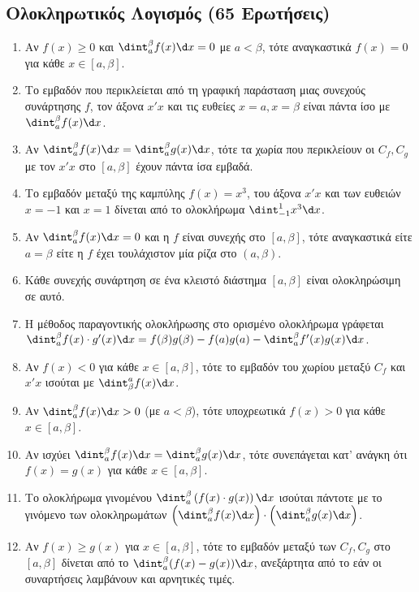 \subsection{Ολοκληρωτικός Λογισμός (65 Ερωτήσεις)}
\begin{enumerate}[label=\textbf{3.\arabic*.}]
    \item Αν $f(x) \ge 0$ και $\dint_{a}^{\beta} f(x)\d x = 0$ με $a < \beta$, τότε αναγκαστικά $f(x)=0$ για κάθε $x \in [a, \beta]$.
    \item Το εμβαδόν που περικλείεται από τη γραφική παράσταση μιας συνεχούς συνάρτησης $f$, τον άξονα $x'x$ και τις ευθείες $x=a, x=\beta$ είναι πάντα ίσο με $\dint_{a}^{\beta} f(x)\d x$.
    \item Αν $\dint_a^\beta f(x)\d x = \dint_a^\beta g(x)\d x$, τότε τα χωρία που περικλείουν οι $C_f, C_g$ με τον $x'x$ στο $[a, \beta]$ έχουν πάντα ίσα εμβαδά.
    \item Το εμβαδόν μεταξύ της καμπύλης $f(x)=x^3$, του άξονα $x'x$ και των ευθειών $x=-1$ και $x=1$ δίνεται από το ολοκλήρωμα $\dint_{-1}^1 x^3 \d x$.
    \item Αν $\dint_a^\beta f(x)\d x = 0$ και η $f$ είναι συνεχής στο $[a, \beta]$, τότε αναγκαστικά είτε $a = \beta$ είτε η $f$ έχει τουλάχιστον μία ρίζα στο $(a,\beta)$.
    \item Κάθε συνεχής συνάρτηση σε ένα κλειστό διάστημα $[a,\beta]$ είναι ολοκληρώσιμη σε αυτό.
    \item Η μέθοδος παραγοντικής ολοκλήρωσης στο ορισμένο ολοκλήρωμα γράφεται $\dint_{a}^{\beta} f(x) \cdot g'(x) \d x = f(\beta)g(\beta) - f(a)g(a) - \dint_{a}^{\beta} f'(x)g(x) \d x$.
    \item Αν $f(x) < 0$ για κάθε $x \in [a, \beta]$, τότε το εμβαδόν του χωρίου μεταξύ $C_f$ και $x'x$ ισούται με $\dint_{\beta}^{a} f(x)\d x$.
    \item Αν $\dint_{a}^{\beta} f(x)\d x > 0$ (με $a < \beta$), τότε υποχρεωτικά $f(x) > 0$ για κάθε $x \in [a, \beta]$.
    \item Αν ισχύει $\dint_a^\beta f(x) \d x = \dint_a^\beta g(x) \d x$, τότε συνεπάγεται κατ' ανάγκη ότι $f(x) = g(x)$ για κάθε $x \in [a,\beta]$.
    \item Το ολοκλήρωμα γινομένου $\dint_{a}^{\beta} \left( f(x) \cdot g(x) \right) \d x$ ισούται πάντοτε με το γινόμενο των ολοκληρωμάτων $\left( \dint_{a}^{\beta} f(x)\d x \right) \cdot \left( \dint_{a}^{\beta} g(x)\d x \right)$.
    \item Αν $f(x) \ge g(x)$ για $x \in [a, \beta]$, τότε το εμβαδόν μεταξύ των $C_f, C_g$ στο $[a, \beta]$ δίνεται από το $\dint_{a}^{\beta} (f(x)-g(x))\d x$, ανεξάρτητα από το εάν οι συναρτήσεις λαμβάνουν και αρνητικές τιμές.

\end{enumerate}
